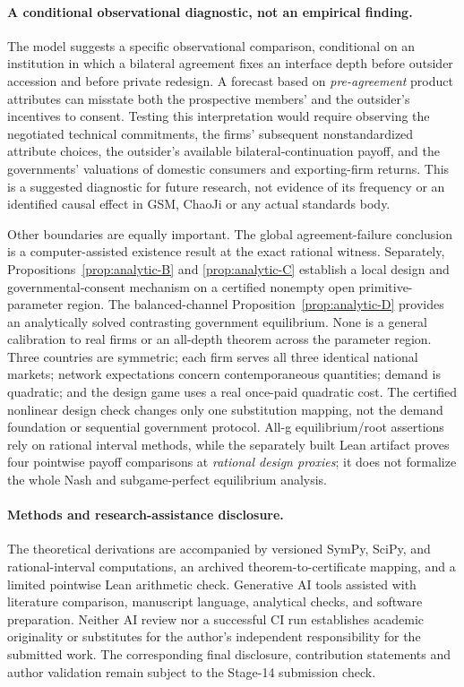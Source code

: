 \paragraph{A conditional observational diagnostic, not an empirical finding.}
The model suggests a specific observational comparison, conditional
on an institution in which a bilateral agreement fixes an interface
depth before outsider accession and before private redesign.
A forecast based on \emph{pre-agreement} product attributes can
misstate both the prospective members' and the outsider's
incentives to consent. Testing this interpretation would require
observing the negotiated technical commitments, the firms'
subsequent nonstandardized attribute choices, the outsider's
available bilateral-continuation payoff, and the governments'
valuations of domestic consumers and exporting-firm returns.
This is a suggested diagnostic for future research, not
evidence of its frequency or an identified causal effect in
GSM, ChaoJi or any actual standards body.

Other boundaries are equally important.
The global agreement-failure conclusion is a
computer-assisted existence result at the exact
rational witness. Separately, Propositions~\ref{prop:analytic-B}
and \ref{prop:analytic-C} establish a local design
and governmental-consent mechanism on a certified
nonempty open primitive-parameter region. The
balanced-channel Proposition~\ref{prop:analytic-D}
provides an analytically solved contrasting government
equilibrium. None is a general calibration to real firms
or an all-depth theorem across the parameter region.
Three countries are symmetric; each firm
serves all three identical national markets;
network expectations concern contemporaneous
quantities; demand is quadratic; and the
design game uses a real once-paid
quadratic cost. The certified nonlinear
design check changes only one substitution
mapping, not the demand foundation or
sequential government protocol.
All-g equilibrium/root assertions rely on
rational interval methods, while the separately
built Lean artifact proves four pointwise
payoff comparisons at \emph{rational design
proxies}; it does not formalize the whole
Nash and subgame-perfect equilibrium analysis.

\paragraph{Methods and research-assistance disclosure.}
The theoretical derivations are accompanied by versioned
SymPy, SciPy, and rational-interval computations, an archived
theorem-to-certificate mapping, and a limited pointwise
Lean arithmetic check. Generative AI tools assisted with
literature comparison, manuscript language, analytical
checks, and software preparation. Neither AI review nor
a successful CI run establishes academic originality or
substitutes for the author's independent responsibility for
the submitted work. The corresponding final disclosure,
contribution statements and author validation remain subject
to the Stage-14 submission check.

